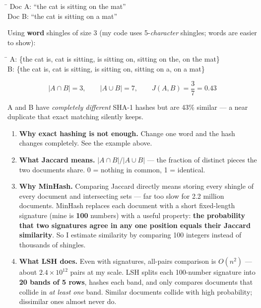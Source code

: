 \documentclass[11pt]{report}
\begin{document}
\begin{vexample}
\begin{tabbing}
\hspace{1.6cm}\=\kill
Doc A: \> ``the cat is sitting on the mat'' \\
Doc B: \> ``the cat is sitting on a mat''
\end{tabbing}

Using \textbf{word} shingles of size 3 (my code uses 5-\emph{character}
shingles; words are easier to show):

\begin{tabbing}
\hspace{1.6cm}\=\kill
A: \> \{the cat is, cat is sitting, is sitting on, sitting on the, on the mat\} \\
B: \> \{the cat is, cat is sitting, is sitting on, sitting on a,\;\; on a mat\}
\end{tabbing}

\[
|A \cap B| = 3, \qquad |A \cup B| = 7, \qquad
J(A,B) = \frac{3}{7} = 0.43
\]

A and B have \emph{completely different} SHA-1 hashes but are 43\% similar ---
a near duplicate that exact matching silently keeps.
\end{vexample}

\begin{enumerate}
\item \textbf{Why exact hashing is not enough.} Change one word and the hash
changes completely. See the example above.
\item \textbf{What Jaccard means.} $|A \cap B| / |A \cup B|$ --- the fraction of
distinct pieces the two documents share. 0 = nothing in common, 1 = identical.
\item \textbf{Why MinHash.} Comparing Jaccard directly means storing every
shingle of every document and intersecting sets --- far too slow for 2.2
million documents. MinHash replaces each document with a short fixed-length
signature (mine is \textbf{100} numbers) with a useful property: \textbf{the
probability that two signatures agree in any one position equals their Jaccard
similarity}. So I estimate similarity by comparing 100 integers instead of
thousands of shingles.
\item \textbf{What LSH does.} Even with signatures, all-pairs comparison is
$O(n^2)$ --- about $2.4\times10^{12}$ pairs at my scale. LSH splits each
100-number signature into \textbf{20 bands of 5 rows}, hashes each band, and
only compares documents that collide in \emph{at least one} band. Similar
documents collide with high probability; dissimilar ones almost never do.
\end{enumerate}
\end{document}
